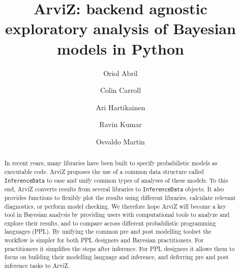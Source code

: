 \documentclass[anonymous=false, %
               format=acmsmall, %
               review=true, %
               screen=true, %
               nonacm=true]{acmart}
\begin{document}
\title{{ArviZ}: backend agnostic exploratory analysis of
{Bayesian} models in {Python}}

\author{Oriol Abril}
\affiliation{%
}

\author{Colin Carroll}

\author{Ari Hartikainen}

\author{Ravin Kumar}
\affiliation{%
}

\author{Osvaldo Martin}

\begin{abstract}
  In recent years, many libraries have been built to specify probabilistic models
  as executable code. ArviZ proposes the use of a common data structure called
  \texttt{InferenceData} to ease and unify common types of analyses of these models.
  To this end, ArviZ converts results from several libraries to
  \texttt{InferenceData} objects. It also provides functions to flexibly plot the
  results using different
  libraries, calculate relevant diagnostics, or perform model checking.
  We therefore hope ArviZ will become a key tool in Bayesian analysis by
  providing users with computational tools to analyze and explore their results, and to
  compare across different probabilistic programming languages (PPL).
  By unifying the common pre and post modelling toolset the workflow is simpler
  for both PPL designers and Bayesian practitioners. For practitioners it
  simplifies the steps after inference. For PPL designers it allows them to
  focus on building their modelling language and inference, and deferring
  pre and post inference tasks to ArviZ.
\end{abstract}
\end{document}
